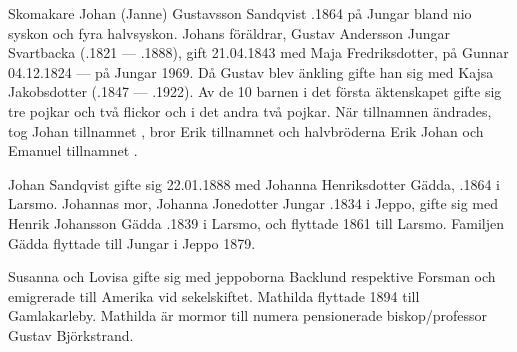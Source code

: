 Skomakare Johan (Janne) Gustavsson Sandqvist .1864 på Jungar bland nio syskon och fyra halvsyskon. Johans föräldrar, Gustav Andersson Jungar Svartbacka (.1821  ---  .1888), gift 21.04.1843 med Maja Fredriksdotter, \textborn på Gunnar 04.12.1824  ---  \textdied på Jungar 1969. Då Gustav blev änkling gifte han sig med Kajsa Jakobsdotter (.1847  ---  .1922). Av de 10 barnen i det första äktenskapet gifte sig tre pojkar och två flickor och i det andra två pojkar. När tillnamnen ändrades, tog Johan tillnamnet , bror Erik tillnamnet  och halvbröderna Erik Johan och Emanuel tillnamnet .


Johan Sandqvist gifte sig 22.01.1888 med Johanna Henriksdotter Gädda, .1864 i Larsmo. Johannas mor, Johanna Jonedotter Jungar .1834 i Jeppo, gifte sig med Henrik Johansson Gädda .1839 i Larsmo, och flyttade 1861 till Larsmo. Familjen Gädda flyttade till Jungar i Jeppo 1879.
\begin{jhchildren}
  \item {}
  \item {}
  \item {}
  \item {}
  \item {}
\end{jhchildren}
Susanna och Lovisa gifte sig med jeppoborna Backlund respektive Forsman och emigrerade till Amerika vid sekelskiftet. Mathilda flyttade 1894 till Gamlakarleby. Mathilda är mormor till numera pensionerade biskop/professor Gustav Björkstrand.

